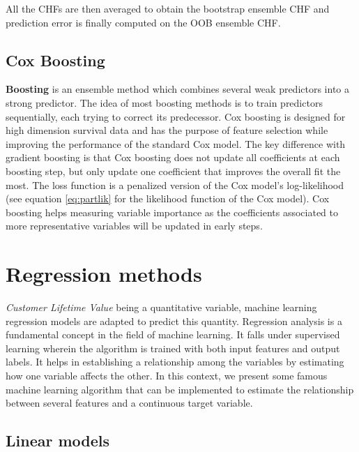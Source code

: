 \documentclass[
]{book}
\begin{document}
All the CHFs are then averaged to obtain the bootstrap ensemble CHF and prediction error is finally computed on the OOB ensemble CHF.

\hypertarget{cox-boosting}{%
\subsection{Cox Boosting}\label{cox-boosting}}

\textbf{Boosting} is an ensemble method which combines several weak predictors into a strong predictor. The idea of most boosting methods is to train predictors sequentially, each trying to correct its predecessor. Cox boosting \citep{COX_BOOSTING} is designed for high dimension survival data and has the purpose of feature selection while improving the performance of the standard Cox model. The key difference with gradient boosting is that Cox boosting does not update all coefficients at each boosting step, but only update one coefficient that improves the overall fit the most. The loss function is a penalized version of the Cox model's log-likelihood (see equation \eqref{eq:partlik} for the likelihood function of the Cox model). Cox boosting helps measuring variable importance as the coefficients associated to more representative variables will be updated in early steps.

\hypertarget{regression-methods}{%
\section{Regression methods}\label{regression-methods}}

\emph{Customer Lifetime Value} being a quantitative variable, machine learning regression models are adapted to predict this quantity. Regression analysis is a fundamental concept in the field of machine learning. It falls under supervised learning wherein the algorithm is trained with both input features and output labels. It helps in establishing a relationship among the variables by estimating how one variable affects the other. In this context, we present some famous machine learning algorithm that can be implemented to estimate the relationship between several features and a continuous target variable.

\hypertarget{linear-models}{%
\subsection{Linear models}\label{linear-models}}
\end{document}
